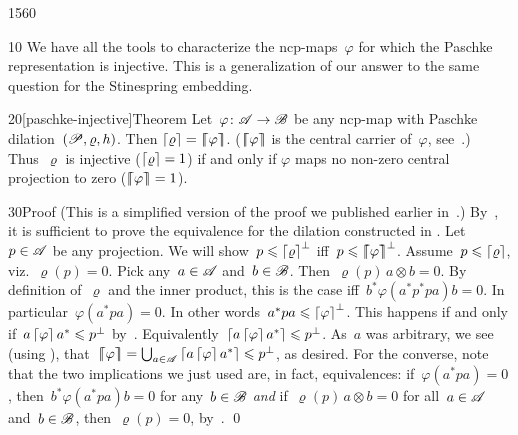 \begin{parsec}{1560}%
\begin{point}{10}%
We have all the tools to characterize
    the ncp-maps~$\varphi$
    for which the Paschke representation is injective.
This is a generalization of our answer\cite{stineinj}
    to the same question for the Stinespring embedding.
\end{point}
\begin{point}{20}[paschke-injective]{Theorem}%
Let~$\varphi\colon \mathscr{A} \to \mathscr{B}$ be any ncp-map
    with Paschke dilation~$(\mathscr{P}, \varrho, h)$.
Then $\left\lceil\varrho\right\rceil = \left\lceil\!\!\left\lceil\varphi\right\rceil\!\!\right\rceil$.
($\left\lceil\!\!\left\lceil\varphi\right\rceil\!\!\right\rceil$ is the central carrier of~$\varphi$, see~.)
Thus~$\varrho$ is injective ($\left\lceil\varrho\right\rceil=1$) if and only if $\varphi$
maps no non-zero central projection to zero ($\left\lceil\!\!\left\lceil\varphi\right\rceil\!\!\right\rceil=1$).
\begin{point}{30}{Proof}%
(This is a simplified version of the proof we published earlier
    in~\cite[thm.~30]{paschke}.)
By~,
    it is sufficient to prove the equivalence
    for the dilation constructed in .
Let~$p \in \mathscr{A}$ be any projection.
We will show~$p \leqslant \left\lceil\varrho\right\rceil^\perp$ iff~$p \leqslant \left\lceil\!\!\left\lceil\varphi\right\rceil\!\!\right\rceil^\perp$.
Assume~$p \leqslant \left\lceil\varrho\right\rceil$,
    viz.~$\varrho(p) = 0$.
Pick any~$a \in \mathscr{A}$ and~$b\in \mathscr{B}$.
Then~$\varrho(p)\, a\otimes b = 0$.
By definition of~$\varrho$ and the inner product,
    this is the case iff~$b^* \varphi(a^*p^* pa) b = 0$.
In particular~$\varphi(a^* p a) = 0$.
In other words~$a^* p a \leqslant \left\lceil\varphi\right\rceil^\perp$.
This happens if and only if~$a \left\lceil\varphi\right\rceil a^* \leqslant p^\perp$
    by~.
Equivalently~$\left\lceil a \left\lceil\varphi\right\rceil a^*\right\rceil \leqslant p^\perp$.
As~$a$ was arbitrary,
    we see (using ),
    that~$\left\lceil\!\!\left\lceil\varphi\right\rceil\!\!\right\rceil = \bigcup_{a \in \mathscr{A}} \left\lceil a \left\lceil\varphi\right\rceil a^*\right\rceil
            \leqslant p^\perp$, as desired.
For the converse, note that
    the two implications we just used are, in fact, equivalences:
        if~$\varphi(a^* p a) =0$,
        then~$b^*\varphi(a^* pa) b = 0$ for any~$b \in \mathscr{B}$
        \emph{and} if~$\varrho(p)\, a \otimes b = 0$
        for all~$a \in \mathscr{A}$ and~$b\in \mathscr{B}$,
        then~$\varrho(p) = 0$, by~.
\qed
\end{point}
\end{point}
\end{parsec}

